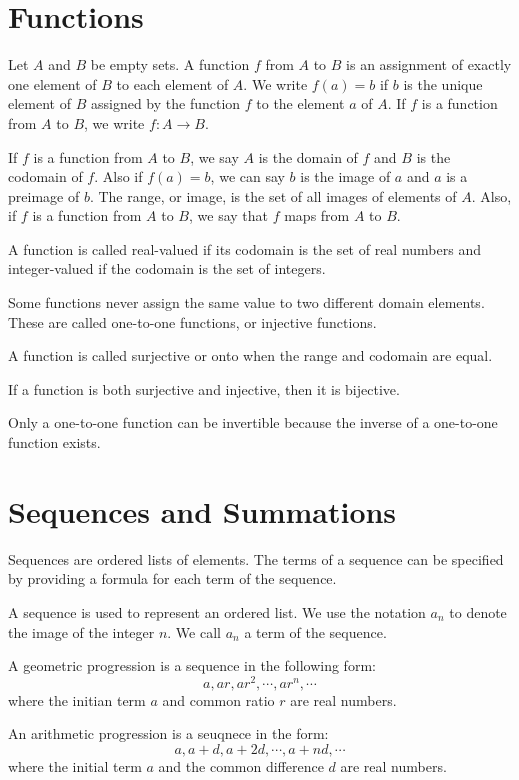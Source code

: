 \documentclass[../discrete.tex]{subfiles}
\begin{document}
\section{Functions}
\begin{definition}
    Let $A$ and $B$ be empty sets. A function $f$ from $A$ to $B$ is an assignment of exactly 
    one element of $B$ to each element of $A$. We write $f(a)=b$ if $b$ is the unique element of $B$ 
    assigned by the function $f$ to the element $a$ of $A$. If $f$ is a function from $A$ to $B$, 
    we write $f: A\rightarrow B$.
\end{definition}

If $f$ is a function from $A$ to $B$, we say $A$ is the domain of $f$ and $B$ is the codomain of $f$. 
Also if $f(a)=b$, we can say $b$ is the image of $a$ and $a$ is a preimage of $b$. The range, or image, 
is the set of all images of elements of $A$. Also, if $f$ is a function from $A$ to $B$, we say that $f$ 
maps from $A$ to $B$.

A function is called real-valued if its codomain is the set of real numbers and integer-valued if the codomain is the set of integers. 

Some functions never assign the same value to two different domain elements. These are called one-to-one functions, or injective functions.

A function is called surjective or onto when the range and codomain are equal.

If a function is both surjective and injective, then it is bijective.

Only a one-to-one function can be invertible because the inverse of a one-to-one function exists.

\section{Sequences and Summations}
Sequences are ordered lists of elements. The terms of a sequence can be specified by providing a formula for each term of the sequence. 

A sequence is used to represent an ordered list. We use the notation $a_n$ to denote the image of 
the integer $n$. We call $a_n$ a term of the sequence.

A geometric progression is a sequence in the following form:
\[a,ar,ar^2,\cdots,ar^n,\cdots\] 
where the initian term $a$ and common ratio $r$ are real numbers. 

An arithmetic progression is a seuqnece in the form:
\[a,a+d,a+2d,\cdots,a+nd,\cdots\]
where the initial term $a$ and the common difference $d$ are real numbers.
\end{document}
